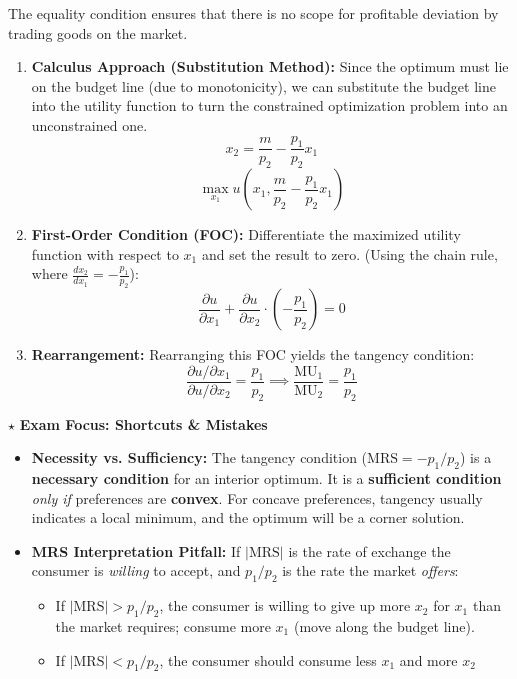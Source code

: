 \documentclass{article}
\begin{document}
The equality condition ensures that there is no scope for profitable deviation by trading goods on the market.
\begin{enumerate}
    \item \textbf{Calculus Approach (Substitution Method):} Since the optimum must lie on the budget line (due to monotonicity), we can substitute the budget line into the utility function to turn the constrained optimization problem into an unconstrained one.
    \[x_2 = \frac{m}{p_2} - \frac{p_1}{p_2} x_1\]
    \[\max_{x_1} u\left(x_1, \frac{m}{p_2} - \frac{p_1}{p_2} x_1\right)\]

    \item \textbf{First-Order Condition (FOC):} Differentiate the maximized utility function with respect to $x_1$ and set the result to zero. (Using the chain rule, where $\frac{dx_2}{dx_1} = -\frac{p_1}{p_2}$):
    \[\frac{\partial u}{\partial x_1} + \frac{\partial u}{\partial x_2} \cdot \left( -\frac{p_1}{p_2} \right) = 0\]

    \item \textbf{Rearrangement:} Rearranging this FOC yields the tangency condition:
    \[\frac{\partial u / \partial x_1}{\partial u / \partial x_2} = \frac{p_1}{p_2} \implies \frac{\text{MU}_1}{\text{MU}_2} = \frac{p_1}{p_2}\]
\end{enumerate}

$\star$ \textbf{Exam Focus: Shortcuts \& Mistakes}
\begin{itemize}
    \item \textbf{Necessity vs. Sufficiency:} The tangency condition ($\text{MRS} = -p_1/p_2$) is a \textbf{necessary condition} for an interior optimum. It is a \textbf{sufficient condition} \textit{only if} preferences are \textbf{convex}. For concave preferences, tangency usually indicates a local minimum, and the optimum will be a corner solution.

    \item \textbf{MRS Interpretation Pitfall:} If $|\text{MRS}|$ is the rate of exchange the consumer is \textit{willing} to accept, and $p_1/p_2$ is the rate the market \textit{offers}:
    \begin{itemize}
        \item If $|\text{MRS}| > p_1/p_2$, the consumer is willing to give up more $x_2$ for $x_1$ than the market requires; consume more $x_1$ (move along the budget line).
        \item If $|\text{MRS}| < p_1/p_2$, the consumer should consume less $x_1$ and more $x_2$
    \end{itemize}
\end{itemize}
\end{document}
